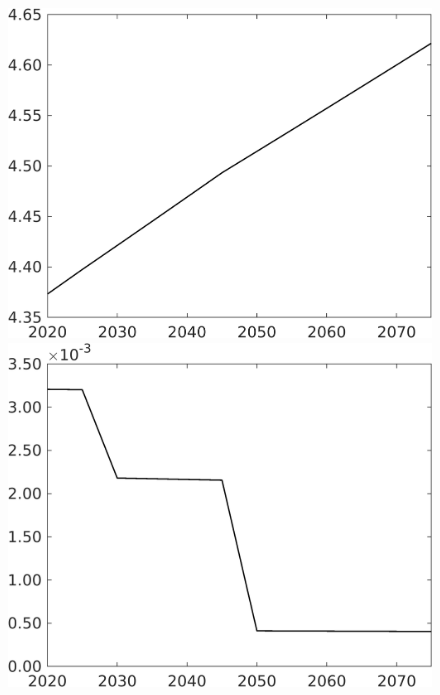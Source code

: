 \begin{figure}[h!!]
\begin{minipage}[]{0.32\textwidth}
	\end{minipage}
\begin{minipage}[]{0.32\textwidth}
	\includegraphics[width=1\textwidth]{../../codding_model/own_basedOnFried/optimalPol_elastS_DisuSci/figures/all_1705/Single_OPT_T_NoTaus_An_spillover0_sep1_BN0_ineq0_etaa0.79.png}
\end{minipage}
	\begin{minipage}[]{0.32\textwidth}
	\includegraphics[width=1\textwidth]{../../codding_model/own_basedOnFried/optimalPol_elastS_DisuSci/figures/all_1705/Single_OPT_T_NoTaus_Lf_spillover0_sep1_BN0_ineq0_etaa0.79.png}

\end{minipage}
\end{figure}
